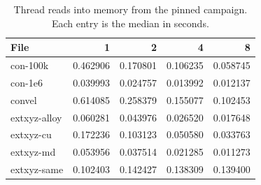 \begin{table}[tbp]
\centering
\footnotesize
\caption{Thread reads into memory from the pinned campaign. Each entry is the median in seconds.}
\label{tab:r6-read}
\begin{tabular}{@{}lrrrr@{}}
\toprule
File & 1 & 2 & 4 & 8 \\
\midrule
con-100k & 0.462906 & 0.170801 & 0.106235 & 0.058745 \\
con-1e6 & 0.039993 & 0.024757 & 0.013992 & 0.012137 \\
convel & 0.614085 & 0.258379 & 0.155077 & 0.102453 \\
extxyz-alloy & 0.060281 & 0.043976 & 0.026520 & 0.017648 \\
extxyz-cu & 0.172236 & 0.103123 & 0.050580 & 0.033763 \\
extxyz-md & 0.053956 & 0.037514 & 0.021285 & 0.011273 \\
extxyz-same & 0.102403 & 0.142427 & 0.138309 & 0.139400 \\
\bottomrule
\end{tabular}
\end{table}
